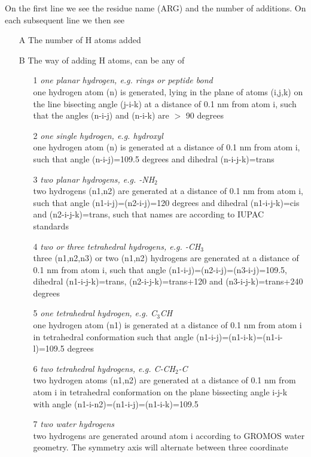 On the first line we see the residue name (ARG) and the number of additions.
On each subsequent line we then see 
\begin{itemize}
\item[A] The number of H atoms added
\item[B] The way of adding H atoms, can be any of
\begin{enumerate}
\item[1]{\em one planar hydrogen, e.g. rings or peptide bond}\\
one hydrogen atom (n) is generated, lying in the plane of atoms
(i,j,k) on the line bisecting angle (j-i-k) at a distance of 0.1 nm
from atom i, such that the angles (n-i-j) and (n-i-k) are $>$ 90
degrees
\item[2]{\em one single hydrogen, e.g. hydroxyl}\\
one hydrogen atom (n) is generated at a distance of 0.1 nm from atom
i, such that angle (n-i-j)=109.5 degrees and dihedral (n-i-j-k)=trans
\item[3]{\em two planar hydrogens, e.g. -NH{$_2$}}\\
two hydrogens (n1,n2) are generated at a distance of 0.1 nm from atom
i, such that angle (n1-i-j)=(n2-i-j)=120 degrees and dihedral
(n1-i-j-k)=cis and (n2-i-j-k)=trans, such that names are according to
IUPAC standards~\cite{iupac70}
\item[4]{\em two or three tetrahedral hydrogens, e.g. -CH{$_3$}}\\
three (n1,n2,n3) or two (n1,n2) hydrogens are generated at a distance
of 0.1 nm from atom i, such that angle
(n1-i-j)=(n2-i-j)=(n3-i-j)=109.5, dihedral (n1-i-j-k)=trans,
(n2-i-j-k)=trans+120 and (n3-i-j-k)=trans+240 degrees
\item[5]{\em one tetrahedral hydrogen, e.g. C{$_3$}CH}\\
one hydrogen atom (n1) is generated at a distance of 0.1 nm from atom
i in tetrahedral conformation such that angle
(n1-i-j)=(n1-i-k)=(n1-i-l)=109.5 degrees
\item[6]{\em two tetrahedral hydrogens, e.g. C-CH{$_2$}-C}\\
two hydrogen atoms (n1,n2) are generated at a distance of 0.1 nm from
atom i in tetrahedral conformation on the plane bissecting angle i-j-k
with angle (n1-i-n2)=(n1-i-j)=(n1-i-k)=109.5
\item[7]{\em two water hydrogens}\\
two hydrogens are generated around atom i according to GROMOS water
geometry. The symmetry axis will alternate between three coordinate

\end{enumerate}
\end{itemize}
